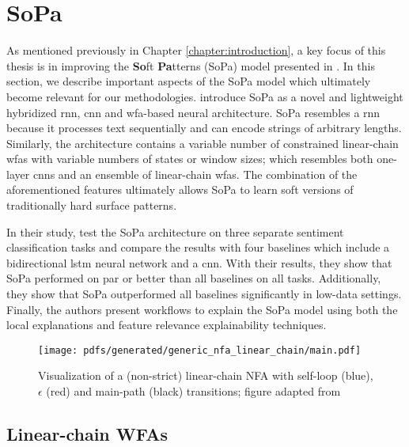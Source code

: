 \section{SoPa}

\label{section:sopa}

As mentioned previously in Chapter \ref{chapter:introduction}, a key focus of
this thesis is in improving the \textbf{So}ft \textbf{Pa}tterns (SoPa) model
presented in \citet{schwartz2018sopa}. In this section, we describe important
aspects of the SoPa model which ultimately become relevant for our
methodologies. \citet{schwartz2018sopa} introduce SoPa as a novel and
lightweight hybridized \ac{rnn}, \ac{cnn} and \ac{wfa}-based neural architecture. SoPa
resembles a \ac{rnn} because it processes text sequentially and can encode strings of
arbitrary lengths. Similarly, the architecture contains a variable number of
constrained linear-chain \ac{wfas} with variable numbers of states or window sizes;
which resembles both one-layer \ac{cnn}s and an ensemble of linear-chain \ac{wfas}. The
combination of the aforementioned features ultimately allows SoPa to learn soft
versions of traditionally hard surface patterns.

In their study, \citet{schwartz2018sopa} test the SoPa architecture on three
separate sentiment classification tasks and compare the results with four
baselines which include a bidirectional \ac{lstm} neural network and a \ac{cnn}.
With their results, they show that SoPa performed on par or better than all
baselines on all tasks. Additionally, they show that SoPa outperformed all
baselines significantly in low-data settings. Finally, the authors present
workflows to explain the SoPa model using both the local explanations and
feature relevance explainability techniques.

\begin{figure}[t]
  \centering
  \texttt{[image: pdfs/generated/generic\_nfa\_linear\_chain/main.pdf]}
  \caption{Visualization of a (non-strict) linear-chain NFA with
    self-loop (blue), $\epsilon$ (red) and main-path (black) transitions; figure
    adapted from \citet{schwartz2018sopa}}
  \label{fig:fa}
\end{figure}

\subsection{Linear-chain WFAs}

\label{section:sopa_lc_wfa}


